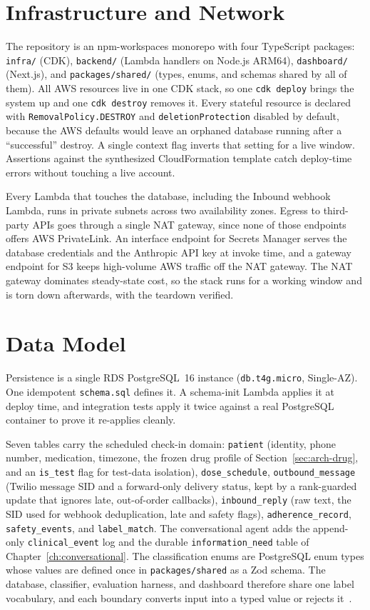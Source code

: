 \section{Infrastructure and Network}
\label{sec:arch-iac}

The repository is an npm-workspaces monorepo with four TypeScript packages:
\texttt{infra/} (CDK), \texttt{backend/} (Lambda handlers on Node.js ARM64),
\texttt{dashboard/} (Next.js), and \texttt{packages/shared/} (types, enums, and
schemas shared by all of them). All AWS resources live in one CDK stack, so one
\texttt{cdk deploy} brings the system up and one \texttt{cdk destroy} removes
it. Every stateful resource is declared with \texttt{RemovalPolicy.DESTROY} and
\texttt{deletionProtection} disabled by default, because the AWS defaults would
leave an orphaned database running after a ``successful'' destroy. A single
context flag inverts that setting for a live window. Assertions against the
synthesized CloudFormation template catch deploy-time errors without touching a
live account.

Every Lambda that touches the database, including the Inbound webhook Lambda,
runs in private subnets across two availability zones. Egress to third-party
APIs goes through a single NAT gateway, since none of those endpoints offers
AWS PrivateLink. An interface endpoint for Secrets Manager serves the database
credentials and the Anthropic API key at invoke time, and a gateway endpoint
for S3 keeps high-volume AWS traffic off the NAT gateway. The NAT gateway
dominates steady-state cost, so the stack runs for a working window and is
torn down afterwards, with the teardown verified.

\section{Data Model}
\label{sec:arch-data}

Persistence is a single RDS PostgreSQL~16 instance (\texttt{db.t4g.micro},
Single-AZ). One idempotent \texttt{schema.sql} defines it. A schema-init Lambda
applies it at deploy time, and integration tests apply it twice against a real
PostgreSQL container to prove it re-applies cleanly.

Seven tables carry the scheduled check-in domain: \texttt{patient} (identity,
phone number, medication, timezone, the frozen drug profile of
Section~\ref{sec:arch-drug}, and an \texttt{is\_test} flag for test-data
isolation), \texttt{dose\_schedule}, \texttt{outbound\_message} (Twilio message
SID and a forward-only delivery status, kept by a rank-guarded update that
ignores late, out-of-order callbacks), \texttt{inbound\_reply} (raw text, the
SID used for webhook deduplication, late and safety flags),
\texttt{adherence\_record}, \texttt{safety\_events}, and \texttt{label\_match}.
The conversational agent adds the append-only \texttt{clinical\_event} log and
the durable \texttt{information\_need} table of
Chapter~\ref{ch:conversational}. The classification enums are PostgreSQL enum
types whose values are defined once in \texttt{packages/shared} as a Zod
schema. The database, classifier, evaluation harness, and dashboard therefore
share one label vocabulary, and each boundary converts input into a typed value
or rejects it~\cite{king2019parse}.


